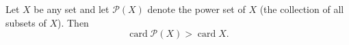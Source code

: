 Let $X$ be any set and let $\mathcal{P}(X)$ denote the power set of $X$ (the collection of all subsets of $X$). Then
$$
\operatorname{card} \mathcal{P}(X) > \operatorname{card} X.
$$
